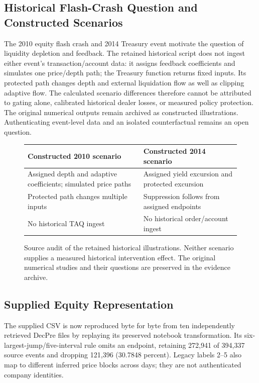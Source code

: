 \documentclass[12pt]{article}
\theoremstyle{definition}
\theoremstyle{remark}
\begin{document}
\subsection{Historical Flash-Crash Question and Constructed Scenarios}
\label{sec:historical_flash_crashes}
The 2010 equity flash crash and 2014 Treasury event motivate the question of liquidity depletion and feedback. The retained historical script does not ingest either event's transaction/account data: it assigns feedback coefficients and simulates one price/depth path; the Treasury function returns fixed inputs. Its protected path changes depth and external liquidation flow as well as clipping adaptive flow. The calculated scenario differences therefore cannot be attributed to gating alone, calibrated historical dealer losses, or measured policy protection. The original numerical outputs remain archived as constructed illustrations. Authenticating event-level data and an isolated counterfactual remains an open question.
\begin{figure}[htbp]\centering
\begin{tabularx}{\textwidth}{XX}\toprule
Constructed 2010 scenario & Constructed 2014 scenario \\\midrule
Assigned depth and adaptive coefficients; simulated price paths & Assigned yield excursion and protected excursion \\
Protected path changes multiple inputs & Suppression follows from assigned endpoints \\
No historical TAQ ingest & No historical order/account ingest \\\bottomrule\end{tabularx}
\caption{Source audit of the retained historical illustrations. Neither scenario supplies a measured historical intervention effect. The original numerical studies and their questions are preserved in the evidence archive.}
\label{fig:equity_flash_crash_taq}\end{figure}

\subsection{Supplied Equity Representation}
The supplied CSV is now reproduced byte for byte from ten independently retrieved DecPre files by replaying its preserved notebook transformation. Its six-largest-jump/five-interval rule omits an endpoint, retaining 272,941 of 394,337 source events and dropping 121,396 (30.7848 percent). Legacy labels 2--5 also map to different inferred price blocks across days; they are not authenticated company identities.
\end{document}
